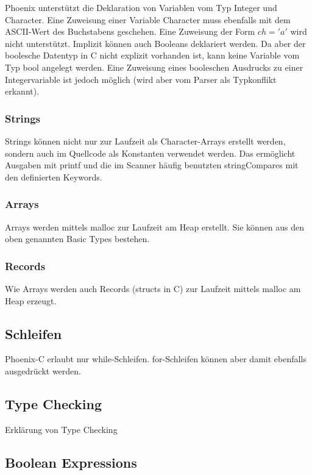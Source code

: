 \documentclass[a4paper,12pt]{article}
\begin{document}
	Phoenix unterstützt die Deklaration von Variablen vom Typ Integer und Character.
	Eine Zuweisung einer Variable Character muss ebenfalls mit dem ASCII-Wert des Buchstabens geschehen.
	Eine Zuweisung der Form $ch='a'$ wird nicht unterstützt.
	Implizit können auch Booleans deklariert werden.
	Da aber der boolesche Datentyp in C nicht explizit vorhanden ist, kann keine Variable vom Typ bool angelegt werden.
	Eine Zuweisung eines booleschen Ausdrucks zu einer Integervariable ist jedoch möglich (wird aber vom Parser als Typkonflikt erkannt).

	\subsubsection{Strings}

	Strings können nicht nur zur Laufzeit als Character-Arrays erstellt werden, sondern auch im Quellcode als Konstanten verwendet werden.
	Das ermöglicht Ausgaben mit printf und die im Scanner häufig benutzten stringCompares mit den definierten Keywords.

	\subsubsection{Arrays}

	Arrays werden mittels malloc zur Laufzeit am Heap erstellt.
	Sie können aus den oben genannten Basic Types bestehen.

	\subsubsection{Records}

	Wie Arrays werden auch Records (structs in C) zur Laufzeit mittels malloc am Heap erzeugt.

	\subsection{Schleifen}

	Phoenix-C erlaubt nur while-Schleifen.
	for-Schleifen können aber damit ebenfalls ausgedrückt werden.

	\subsection{Type Checking}
	Erklärung von Type Checking

	\subsection{Boolean Expressions}
\end{document}
